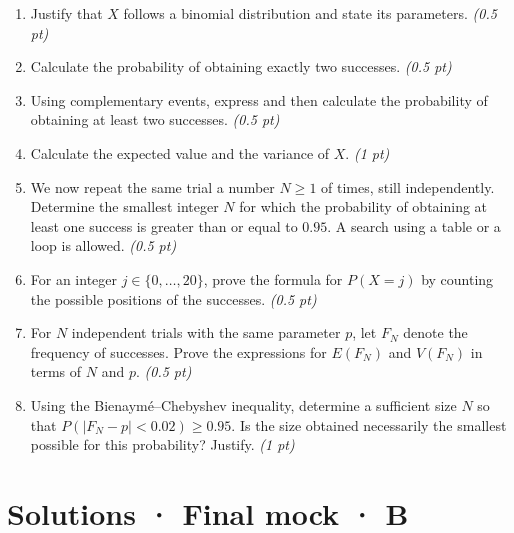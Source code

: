\begin{enumerate}

\item Justify that $X$ follows a binomial distribution and state its parameters. \hfill\textit{(0.5 pt)}

\item Calculate the probability of obtaining exactly two successes. \hfill\textit{(0.5 pt)}

\item Using complementary events, express and then calculate the probability of obtaining at least two successes. \hfill\textit{(0.5 pt)}

\item Calculate the expected value and the variance of $X$. \hfill\textit{(1 pt)}

\item We now repeat the same trial a number $N\ge1$ of times, still independently. Determine the smallest integer $N$ for which the probability of obtaining at least one success is greater than or equal to $\num{0,95}$. A search using a table or a loop is allowed. \hfill\textit{(0.5 pt)}

\item For an integer $j\in\{0,\ldots,20\}$, prove the formula for $P(X=j)$ by counting the possible positions of the successes. \hfill\textit{(0.5 pt)}

\item For $N$ independent trials with the same parameter $p$, let $F_N$ denote the frequency of successes. Prove the expressions for $E(F_N)$ and $V(F_N)$ in terms of $N$ and $p$. \hfill\textit{(0.5 pt)}

\item Using the Bienaymé–Chebyshev inequality, determine a sufficient size $N$ so that $P(|F_N-p|<\num{0,02})\ge\num{0,95}$. Is the size obtained necessarily the smallest possible for this probability? Justify. \hfill\textit{(1 pt)}

\end{enumerate}

\ifmxteacher\mxnewpage

\section*{Solutions · Final mock · B}\label{cor:9-4}

